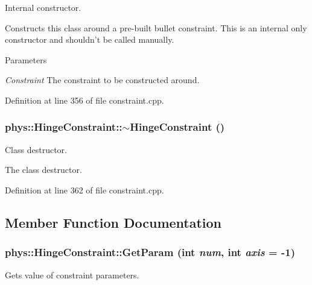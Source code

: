 Internal constructor. 

Constructs this class around a pre-\/built bullet constraint. This is an internal only constructor and shouldn't be called manually. 
\begin{DoxyParams}{Parameters}
\item[{\em Constraint}]The constraint to be constructed around. \end{DoxyParams}


Definition at line 356 of file constraint.cpp.

\hypertarget{classphys_1_1HingeConstraint_af97da06f82fa1903bb20393760f4ae34}{
\subsubsection[{$\sim$HingeConstraint}]{\setlength{\rightskip}{0pt plus 5cm}phys::HingeConstraint::$\sim$HingeConstraint ()}}
\label{d3/d0d/classphys_1_1HingeConstraint_af97da06f82fa1903bb20393760f4ae34}


Class destructor. 

The class destructor. 

Definition at line 362 of file constraint.cpp.



\subsection{Member Function Documentation}
\hypertarget{classphys_1_1HingeConstraint_a7e8c001ee6291bf457c9860124cacaf8}{
\subsubsection[{GetParam}]{ phys::HingeConstraint::GetParam (int {\em num}, \/  int {\em axis} = {\ttfamily -\/1})}}
\label{d3/d0d/classphys_1_1HingeConstraint_a7e8c001ee6291bf457c9860124cacaf8}


Gets value of constraint parameters. 

